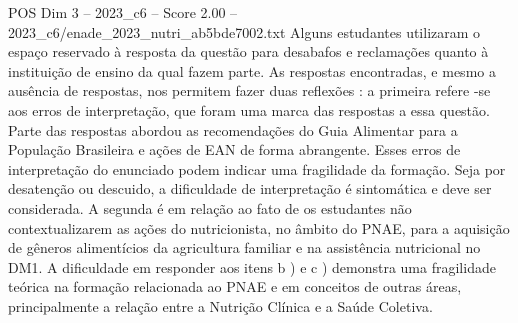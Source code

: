 \begin{textsample}{POS Dim 3 – 2023\_c6 – Score 2.00 – 2023\_c6/enade\_2023\_nutri\_ab5bde7002.txt}
Alguns estudantes utilizaram o espaço reservado à resposta da questão para desabafos e reclamações quanto à instituição de ensino da qual fazem parte.
As respostas encontradas, e mesmo a ausência de respostas, nos permitem fazer duas reflexões : a primeira refere -se aos erros de interpretação, que foram uma marca das respostas a essa questão.
Parte das respostas abordou as recomendações do Guia Alimentar para a População Brasileira e ações de EAN de forma abrangente.
Esses erros de interpretação do enunciado podem indicar uma fragilidade da formação.
Seja por desatenção ou descuido, a dificuldade de interpretação é sintomática e deve ser considerada.
A segunda é em relação ao fato de os estudantes não contextualizarem as ações do nutricionista, no âmbito do PNAE, para a aquisição de gêneros alimentícios da agricultura familiar e na assistência nutricional no DM1.
A dificuldade em responder aos itens b ) e c ) demonstra uma fragilidade teórica na formação relacionada ao PNAE e em conceitos de outras áreas, principalmente a relação entre a Nutrição Clínica e a Saúde Coletiva.

\end{textsample}
